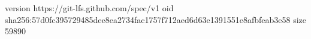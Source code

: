 version https://git-lfs.github.com/spec/v1
oid sha256:57d0fc395729485dee8ea2734fac1757f712aed6d63e1391551e8afbfeab3e58
size 59890
